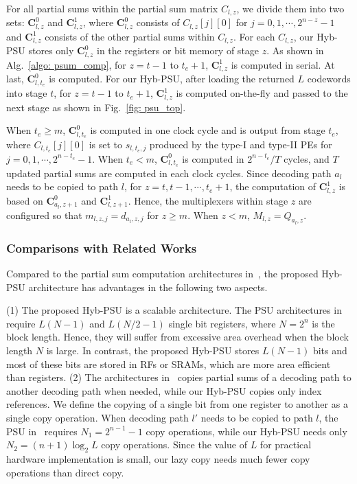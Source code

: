 \documentclass[journal]{IEEEtran}
\begin{document}
For all partial sums within the partial sum matrix $C_{l,z}$, we divide them into two sets: $\mathbf{C}_{l,z}^0$ and $\mathbf{C}_{l,z}^1$, where $\mathbf{C}_{l,z}^0$ consists of $C_{l,z}[j][0]$ for $j=0,1,\cdots,2^{n-z}-1$ and $\mathbf{C}_{l,z}^1$ consists of the other partial sums within $C_{l,z}$. For each $C_{l,z}$, our Hyb-PSU stores only $\mathbf{C}_{l,z}^0$ in the registers or bit memory of stage $z$.  As shown in Alg.~\ref{algo: psum_comp}, for $z=t-1$ to $t_e+1$, $\mathbf{C}_{l,z}^1$ is computed in serial. At last, $\mathbf{C}_{l,t_e}^0$ is computed. For our Hyb-PSU, after loading the returned $L$ codewords into stage $t$, for $z=t-1$ to $t_e+1$, $\mathbf{C}_{l,z}^1$ is computed on-the-fly and passed to the next stage as shown in Fig.~\ref{fig: psu_top}.

When $t_e\geqslant m$, $\mathbf{C}_{l,t_e}^0$ is computed in one clock cycle and is output from stage $t_e$, where $C_{l,t_e}[j][0]$ is set to $s_{l,t_e,j}$ produced by the type-I and type-II PEs for $j=0,1,\cdots,2^{n-t_e}-1$. When $t_e<m$, $\mathbf{C}_{l,t_e}^0$ is computed in $2^{n-t_e}/T$ cycles, and $T$ updated partial sums are computed in each clock cycles. Since decoding path $a_l$ needs to be copied to path $l$, for $z=t,t-1,\cdots, t_e+1$, the computation of $\mathbf{C}_{l,z}^1$ is based on $\mathbf{C}_{a_l,z+1}^0$ and $\mathbf{C}_{l,z+1}^1$. Hence, the multiplexers within stage $z$ are configured so that $m_{l,z,j} = d_{a_l,z,j}$ for $z\geqslant m$. When $z<m$, $M_{l,z} = Q_{a_l,z}$.

\subsubsection{Comparisons with Related Works}
Compared to the partial sum computation architectures in~\cite{tree_list_dec, jun_low_mem_list}, the proposed Hyb-PSU architecture has advantages in the following two aspects.

(1) The proposed Hyb-PSU is a scalable architecture. The PSU architectures in~\cite{tree_list_dec, jun_low_mem_list} require $L(N-1)$ and $L(N/2-1)$ single bit registers, where $N=2^n$ is the block length. Hence, they will suffer from excessive area overhead when the block length $N$ is large. In contrast, the proposed Hyb-PSU stores $L(N-1)$ bits and most of these bits are stored in RFs or SRAMs, which are more area efficient than registers. 
(2) The architectures in~\cite{tree_list_dec, jun_low_mem_list} copies partial sums of a decoding path to another decoding path when needed, while our Hyb-PSU copies only index references. We define the copying of a single bit from one register to another as a single copy operation. When decoding path $l'$ needs to be copied to path $l$, the PSU in~\cite{jun_low_mem_list} requires $N_1 = 2^{n-1}-1$ copy operations, while our Hyb-PSU needs only $N_2 = (n+1)\log_2 L$ copy operations. Since the value of $L$ for practical hardware implementation is small, our lazy copy needs much fewer copy operations than direct copy.
\end{document}
